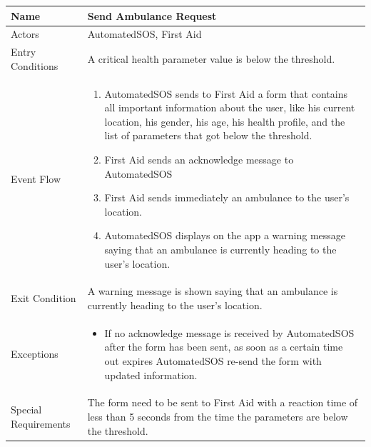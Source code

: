 \begin{enumerate}
\FloatBarrier
\begin{table}[h]
\begin{tabular}{|l|p{}|}
\hline
Name             & Send Ambulance Request \\ \hline
Actors           & AutomatedSOS, First Aid  \\ \hline
Entry Conditions & A critical health parameter value is below the threshold.
\\ \hline
Event Flow       & \begin{enumerate}
            \item AutomatedSOS sends to First Aid a form that contains all important information about the user, like his current location, his gender, his age, his health profile, and the list of parameters that got below the threshold.
            \item First Aid sends an acknowledge message to AutomatedSOS 
            \item First Aid sends immediately an ambulance to the user's location.
            \item AutomatedSOS displays on the app a warning message saying that an ambulance is currently heading to the user's location. 
        \end{enumerate}
\\ \hline
Exit Condition   & A warning message is shown saying that an ambulance is currently heading to the user's location.
\\ \hline
Exceptions       & \begin{itemize}
\item If no acknowledge message is received by AutomatedSOS after the form has been sent, as soon as a certain time out expires AutomatedSOS re-send the form with updated information. 
\end{itemize}
\\ \hline
Special Requirements & The form need to be sent to First Aid with a reaction time of less than 5 seconds from the time the parameters are below the threshold.
\\ \hline 
\end{tabular}
\end{table}
\FloatBarrier


\end{enumerate}
